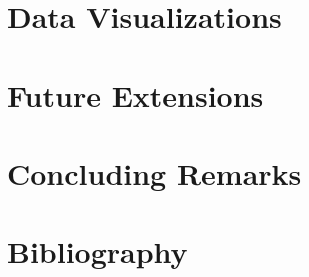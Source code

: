 \documentclass[11pt, a4paper, leqno]{article}
\begin{document}
\section{Data Visualizations} %
\label{sec:section3}




\section{Future Extensions} %
\label{sec:section4}

%


\section*{Concluding Remarks} %
\label{sec:conclusion}

%


\clearpage

\section*{Bibliography} %
\label{sec:bibliography}


\printbibliography
{}





\end{document}
